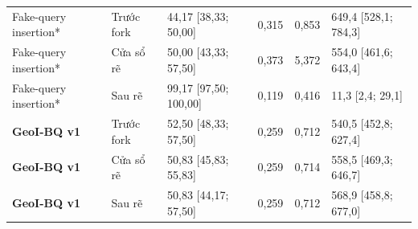 \begin{longtable}{@{}P{3cm}P{2.1cm}P{3.747cm} P{1cm}P{1cm}P{3.747cm}@{}}
Fake-query insertion* & Trước fork & 44{,}17 [38{,}33; 50{,}00] & 0{,}315 & 0{,}853 & 649{,}4 [528{,}1; 784{,}3] \\
Fake-query insertion* & Cửa sổ rẽ & 50{,}00 [43{,}33; 57{,}50] & 0{,}373 & 5{,}372 & 554{,}0 [461{,}6; 643{,}4] \\
Fake-query insertion* & Sau rẽ & 99{,}17 [97{,}50; 100{,}00] & 0{,}119 & 0{,}416 & 11{,}3 [2{,}4; 29{,}1] \\
\textbf{GeoI-BQ v1} & Trước fork & 52{,}50 [48{,}33; 57{,}50] & 0{,}259 & 0{,}712 & 540{,}5 [452{,}8; 627{,}4] \\
\textbf{GeoI-BQ v1} & Cửa sổ rẽ & 50{,}83 [45{,}83; 55{,}83] & 0{,}259 & 0{,}714 & 558{,}5 [469{,}3; 646{,}7] \\
\textbf{GeoI-BQ v1} & Sau rẽ & 50{,}83 [44{,}17; 57{,}50] & 0{,}259 & 0{,}712 & 568{,}9 [458{,}8; 677{,}0] \\
\end{longtable}\endgroup\par
